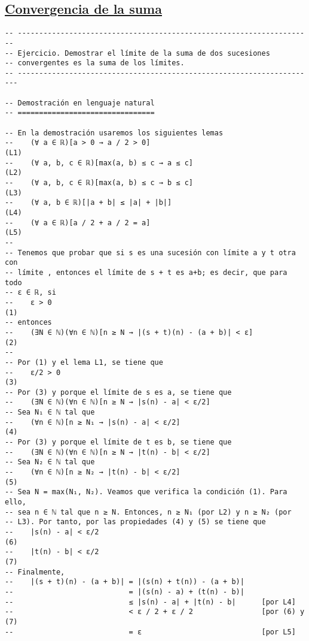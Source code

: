 \subsection{\href{./src/Logica/Convergencia\_de\_la\_suma.lean}{Convergencia de la suma}}
\label{sec:org5799163}
\begin{verbatim}
-- ---------------------------------------------------------------------
-- Ejercicio. Demostrar el límite de la suma de dos sucesiones
-- convergentes es la suma de los límites.
-- ----------------------------------------------------------------------

-- Demostración en lenguaje natural
-- ================================

-- En la demostración usaremos los siguientes lemas
--    (∀ a ∈ ℝ)[a > 0 → a / 2 > 0]                                   (L1)
--    (∀ a, b, c ∈ ℝ)[max(a, b) ≤ c → a ≤ c]                         (L2)
--    (∀ a, b, c ∈ ℝ)[max(a, b) ≤ c → b ≤ c]                         (L3)
--    (∀ a, b ∈ ℝ)[|a + b| ≤ |a| + |b|]                              (L4)
--    (∀ a ∈ ℝ)[a / 2 + a / 2 = a]                                   (L5)
--
-- Tenemos que probar que si s es una sucesión con límite a y t otra con
-- límite , entonces el límite de s + t es a+b; es decir, que para todo
-- ε ∈ ℝ, si
--    ε > 0                                                          (1)
-- entonces
--    (∃N ∈ ℕ)(∀n ∈ ℕ)[n ≥ N → |(s + t)(n) - (a + b)| < ε]           (2)
--
-- Por (1) y el lema L1, se tiene que
--    ε/2 > 0                                                        (3)
-- Por (3) y porque el límite de s es a, se tiene que
--    (∃N ∈ ℕ)(∀n ∈ ℕ)[n ≥ N → |s(n) - a| < ε/2]
-- Sea N₁ ∈ ℕ tal que
--    (∀n ∈ ℕ)[n ≥ N₁ → |s(n) - a| < ε/2]                            (4)
-- Por (3) y porque el límite de t es b, se tiene que
--    (∃N ∈ ℕ)(∀n ∈ ℕ)[n ≥ N → |t(n) - b| < ε/2]
-- Sea N₂ ∈ ℕ tal que
--    (∀n ∈ ℕ)[n ≥ N₂ → |t(n) - b| < ε/2]                            (5)
-- Sea N = max(N₁, N₂). Veamos que verifica la condición (1). Para ello,
-- sea n ∈ ℕ tal que n ≥ N. Entonces, n ≥ N₁ (por L2) y n ≥ N₂ (por
-- L3). Por tanto, por las propiedades (4) y (5) se tiene que
--    |s(n) - a| < ε/2                                               (6)
--    |t(n) - b| < ε/2                                               (7)
-- Finalmente,
--    |(s + t)(n) - (a + b)| = |(s(n) + t(n)) - (a + b)|
--                           = |(s(n) - a) + (t(n) - b)|
--                           ≤ |s(n) - a| + |t(n) - b|      [por L4]
--                           < ε / 2 + ε / 2                [por (6) y (7)
--                           = ε                            [por L5]


\end{verbatim}
